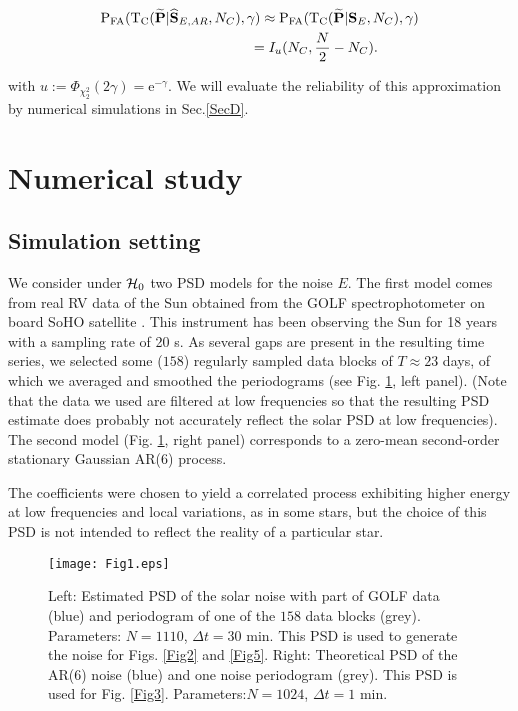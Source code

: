 \documentclass[journal]{IEEEtran}
\begin{document}
\begin{equation}\vspace{-0.1cm}
	\begin{aligned} 
	\label{PFA_param}
 	 &{\rm{P_{FA}}}({\rm T_C}( {\bf \widetilde{\bf P}}|{\widehat{ \bf S}_{E,AR}},N_C ),\gamma)  \approx  {\rm{P_{FA}}}({\rm T_C}( {\bf \widetilde{\bf P}}|{\bf S}_E, N_C),\gamma) \\
 	 &~~~~~~~~~~~~~~~~~~~~~~~~~~~~~~~~ = I_{u} (N_C, \frac{N}{2}-N_C) .
 	 \end{aligned}
\end{equation}

with $ u := \Phi_{\chi_2^2}(2\gamma)= \mathrm{e}^{-\gamma}$.
 We will evaluate the reliability of this approximation by numerical simulations in Sec.\ref{SecD}.
\section{Numerical study}
 \label{sec7} 

 \subsection{Simulation setting}
\label{SecA}
{ 
We consider under $ {\cal{H}}_0$ two PSD models for the noise $E$.
The first model comes from real RV data of the Sun  
obtained from { the} GOLF spectrophotometer on board SoHO satellite \cite{Garcia_2005}. This instrument has been observing the Sun for 18 years with a sampling rate of 20 s. As several gaps are present in the resulting time series, we selected some ($158$) regularly sampled data blocks of $T \approx 23$ days, of which we averaged and smoothed the periodograms (see Fig. \ref{Fig0},  left panel).
	(Note that the data we used are filtered at low frequencies so that the resulting PSD estimate does probably not accurately reflect the solar { PSD} at low frequencies).\\
	 The second model (Fig. \ref{Fig0},  right panel) corresponds to a zero-mean second-order stationary Gaussian AR(6) process.
	 
	
   	
	
	
     	
	
The coefficients were chosen to yield a correlated process exhibiting higher energy at low frequencies  and local variations, as in some stars,
but the choice of this { PSD} is  not intended to reflect  the reality of a particular star. 
  \begin{figure}[htb!]     \centering
	\texttt{[image: Fig1.eps]}
	\caption{  Left: Estimated PSD of the solar noise with part of GOLF data (blue) and periodogram of one of the $158$ data blocks (grey). Parameters: $N = 1110$, $\Delta t = 30$ min. This PSD  is used to generate the noise for Figs. \ref{Fig2} and \ref{Fig5}. Right: Theoretical PSD of the AR(6) noise (blue) and one noise periodogram (grey). This PSD is used for Fig. \ref{Fig3}. Parameters:$N = 1024$, $\Delta t = 1$ min.}
	\label{Fig0}
		\vspace{-0.2cm}
\end{figure}

}
\end{document}
